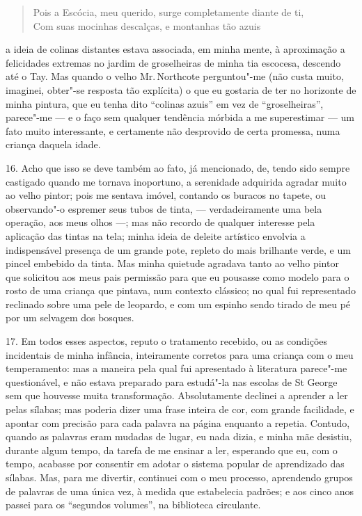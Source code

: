 \begin{verse}
Pois a Escócia, meu querido, surge completamente diante de ti,\\
Com suas mocinhas descalças, e montanhas tão azuis\footnotemark
\end{verse}

\noindent{}a ideia de colinas distantes estava associada, em minha mente, à
aproximação a felicidades extremas no jardim de groselheiras de minha
tia escocesa, descendo até o Tay. Mas quando o velho Mr.\,Northcote
perguntou"-me (não custa muito, imaginei, obter"-se resposta tão
explícita) o que eu gostaria de ter no horizonte de minha pintura, que
eu tenha dito ``colinas azuis'' em vez de ``groselheiras'', parece"-me ---
e o faço sem qualquer tendência mórbida a me superestimar --- um fato
muito interessante, e certamente não desprovido de certa promessa, numa
criança daquela idade.

16. Acho que isso se deve também ao fato, já mencionado, de, tendo sido
sempre castigado quando me tornava inoportuno, a serenidade adquirida
agradar muito ao velho pintor; pois me sentava imóvel, contando os
buracos no tapete, ou observando"-o espremer seus tubos de tinta, ---
verdadeiramente uma bela operação, aos meus olhos ---; mas não recordo de
qualquer interesse pela aplicação das tintas na tela; minha ideia de
deleite artístico envolvia a indispensável presença de um grande pote,
repleto do mais brilhante verde, e um pincel embebido da tinta. Mas
minha quietude agradava tanto ao velho pintor que solicitou aos meus
pais permissão para que eu pousasse como modelo para o rosto de uma
criança que pintava, num contexto clássico; no qual fui representado
reclinado sobre uma pele de leopardo, e com um espinho sendo tirado de
meu pé por um selvagem dos bosques.

17. Em todos esses aspectos, reputo o tratamento recebido, ou as
condições incidentais de minha infância, inteiramente corretos para uma
criança com o meu temperamento: mas a maneira pela qual fui apresentado
à literatura parece"-me questionável, e não estava preparado para
estudá"-la nas escolas de St George sem que houvesse muita transformação.
Absolutamente declinei a aprender a ler pelas sílabas; mas poderia dizer
uma frase inteira de cor, com grande facilidade, e apontar com precisão
para cada palavra na página enquanto a repetia. Contudo, quando as
palavras eram mudadas de lugar, eu nada dizia, e minha mãe desistiu,
durante algum tempo, da tarefa de me ensinar a ler, esperando que eu,
com o tempo, acabasse por consentir em adotar o sistema popular de
aprendizado das sílabas. Mas, para me divertir, continuei com o meu
processo, aprendendo grupos de palavras de uma única vez, à medida que
estabelecia padrões; e aos cinco anos passei para os ``segundos
volumes'', na biblioteca circulante.

